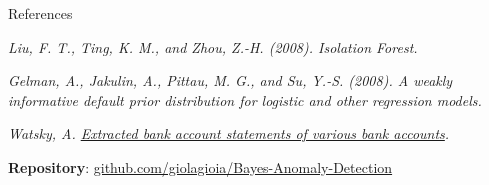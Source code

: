 \documentclass[aspectratio=169,11pt]{beamer}
\begin{document}
\begin{frame}{References}

\large

\textit{Liu, F. T., Ting, K. M., and Zhou, Z.-H. (2008). Isolation Forest.}
\vspace{0.2cm}

\textit{Gelman, A., Jakulin, A., Pittau, M. G., and Su, Y.-S. (2008). A weakly informative default prior distribution for logistic and other regression models.}
\vspace{0.2cm}

\textit{Watsky, A. \href{https://www.kaggle.com/datasets/apoorvwatsky/bank-transaction-data}{Extracted bank account statements of various bank accounts}.}
\vspace{0.2cm}

\textbf{Repository}: \href{https://github.com/giolagioia/Bayes-Anomaly-Detection}{github.com/giolagioia/Bayes-Anomaly-Detection}

\end{frame}
\end{document}
